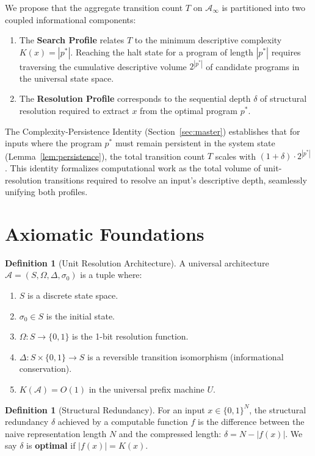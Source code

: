 \documentclass[12pt,a4paper]{article}
\theoremstyle{plain}
\theoremstyle{definition}
\newtheorem{definition}[theorem]{Definition}
\begin{document}
We propose that the aggregate transition count $T$ on $\mathcal{A}_\infty$ is partitioned into 
two coupled informational components:
\begin{enumerate}
    \item The \textbf{Search Profile} relates $T$ to the minimum descriptive complexity 
    $K(x) = |p^{*}|$. Reaching the halt state for a program of length $|p^{*}|$ requires 
    traversing the cumulative descriptive volume $2^{|p^{*}|}$ of candidate programs in the 
    universal state space.
    \item The \textbf{Resolution Profile} corresponds to the sequential depth \(\delta\) of 
    structural resolution required to extract $x$ from the optimal program $p^*$. 
\end{enumerate}

The Complexity-Persistence Identity (Section~\ref{sec:master}) establishes that for inputs 
where the program $p^*$ must remain persistent in the system state (Lemma~\ref{lem:persistence}), 
the total transition count $T$ scales with $(1+\delta) \cdot 2^{|p^{*}|}$. This 
identity formalizes computational work as the total volume of unit-resolution transitions 
required to resolve an input's descriptive depth, seamlessly unifying both profiles.

\section{Axiomatic Foundations} \label{sec:axioms}

\begin{definition}[Unit Resolution Architecture] \label{def:1bit}
A universal architecture $\mathcal{A} = (S, \Omega, \Delta, \sigma_0)$ is a tuple where:
\begin{enumerate}
    \item $S$ is a discrete state space.
    \item $\sigma_0 \in S$ is the initial state.
    \item $\Omega : S \to \{0,1\}$ is the 1-bit resolution function.
    \item $\Delta : S \times \{0,1\} \to S$ is a reversible transition isomorphism (informational 
    conservation).
    \item $K(\mathcal{A}) = O(1)$ in the universal prefix machine $U$.
\end{enumerate}
\end{definition}

\begin{definition}[Structural Redundancy] \label{def:compression}
For an input $x \in \{0,1\}^N$, the structural redundancy $\delta$ achieved by a computable 
function $f$ is the difference between the naive representation length $N$ and the 
compressed length: $\delta = N - |f(x)|$. We say $\delta$ is \textbf{optimal} if $|f(x)| = 
K(x)$.
\end{definition}
\end{document}
